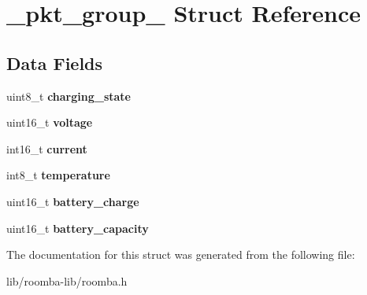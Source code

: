 \hypertarget{struct__pkt__group__3}{}\section{\+\_\+pkt\+\_\+group\+\_ Struct Reference}
\label{struct__pkt__group__3}
\subsection*{Data Fields}
\begin{DoxyCompactItemize}
\item 
\hypertarget{group__roomba-lib_ga6203bea1e00b76dbb7a61943c5c22b1a}{}uint8\+\_\+t {\bfseries charging\+\_\+state}\label{group__roomba-lib_ga6203bea1e00b76dbb7a61943c5c22b1a}

\item 
\hypertarget{group__roomba-lib_ga9fbf52d47f1750117e7e3225b22ff24d}{}uint16\+\_\+t {\bfseries voltage}\label{group__roomba-lib_ga9fbf52d47f1750117e7e3225b22ff24d}

\item 
\hypertarget{group__roomba-lib_ga97c15d9609c2b55522cedc2f4415c1a6}{}int16\+\_\+t {\bfseries current}\label{group__roomba-lib_ga97c15d9609c2b55522cedc2f4415c1a6}

\item 
\hypertarget{group__roomba-lib_gae0f74f4252afce745b4d9208750cbced}{}int8\+\_\+t {\bfseries temperature}\label{group__roomba-lib_gae0f74f4252afce745b4d9208750cbced}

\item 
\hypertarget{group__roomba-lib_ga22283c5ac5d429e82cc923f42efb29f0}{}uint16\+\_\+t {\bfseries battery\+\_\+charge}\label{group__roomba-lib_ga22283c5ac5d429e82cc923f42efb29f0}

\item 
\hypertarget{group__roomba-lib_ga2fe1ef419191101a8511027079014558}{}uint16\+\_\+t {\bfseries battery\+\_\+capacity}\label{group__roomba-lib_ga2fe1ef419191101a8511027079014558}

\end{DoxyCompactItemize}


The documentation for this struct was generated from the following file\+:\begin{DoxyCompactItemize}
\item 
lib/roomba-\/lib/roomba.\+h\end{DoxyCompactItemize}
